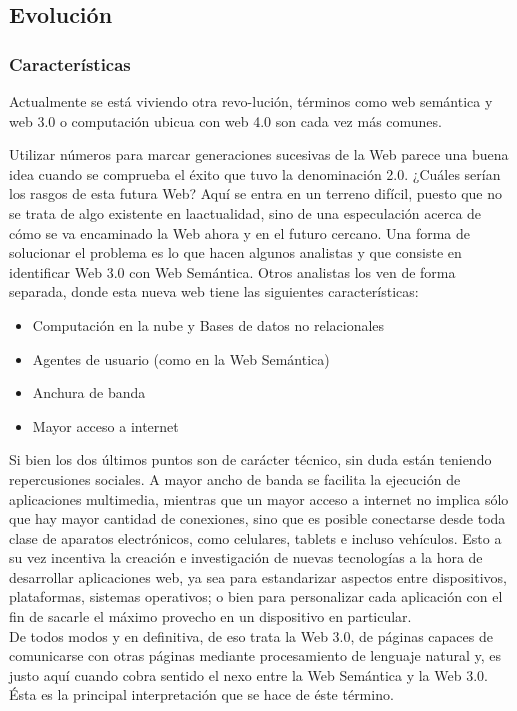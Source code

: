  
\subsection{Evolución}

\subsubsection{Características}
Actualmente se está viviendo otra revo-lución, términos como web semántica y web 3.0 o computación 
ubicua con web 4.0 son cada vez más comunes.

Utilizar números para marcar generaciones sucesivas de la Web parece una buena idea cuando se 
comprueba el éxito que tuvo la denominación 2.0. ¿Cuáles serían los rasgos de esta futura Web? Aquí 
se entra en un terreno difícil, puesto que no se trata de algo existente en laactualidad, sino de una 
especulación acerca de cómo se va encaminado la Web ahora y en el futuro cercano. Una forma de solucionar el 
problema es lo que hacen algunos analistas y que consiste en identificar Web 3.0 con Web Semántica. Otros 
analistas los ven de forma separada, donde esta nueva web tiene las siguientes características:

\begin{itemize}
 \item Computación en la nube y Bases de datos no relacionales
 \item Agentes de usuario (como en la Web Semántica)
 \item Anchura de banda
 \item Mayor acceso a internet
\end{itemize}

Si bien los dos últimos puntos son de carácter técnico, sin duda están teniendo repercusiones sociales. 
A mayor ancho de banda se facilita la ejecución de aplicaciones multimedia, mientras que un mayor acceso 
a internet no implica sólo que hay mayor cantidad de conexiones, sino que es posible conectarse desde toda 
clase de aparatos electrónicos, como celulares, tablets e incluso vehículos. Esto a su vez incentiva la 
creación e investigación de nuevas tecnologías a la hora de desarrollar aplicaciones web, ya sea para estandarizar
aspectos entre dispositivos, plataformas, sistemas operativos; o bien para personalizar cada aplicación con el 
fin de sacarle el máximo provecho en un dispositivo en particular.\\

De todos modos y en definitiva, de eso trata la Web 3.0, de páginas capaces de comunicarse con otras páginas 
mediante procesamiento de lenguaje natural y, es justo aquí cuando cobra sentido el nexo entre la Web Semántica 
y la Web 3.0. Ésta es la principal interpretación que se hace de éste término. 

